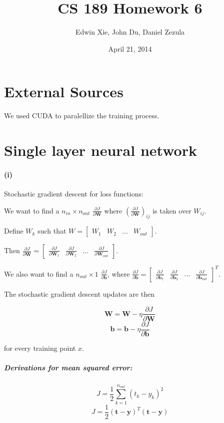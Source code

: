 \documentclass{article}
\title{CS 189 Homework 6}
\author{Edwin Xie, John Du, Daniel Zezula}
\date{April 21, 2014}
\begin{document}
\maketitle

\section*{External Sources}
We used CUDA to paralellize the training process.
\section*{Single layer neural network}

\paragraph{(i)} Stochastic gradient descent for loss functions:

We want to find a $n_{in} \times n_{out}$ $\frac{\partial{J}}{\partial{\mathbf{W}}}$
where $(\frac{\partial{J}}{\partial{\mathbf{W}}})_{ij}$ is taken over $W_{ij}$.

Define $W_k$ such that $W = \begin{bmatrix} W_1 & W_2 & ... & W_{out} \end{bmatrix}$.

Then $\frac{\partial{J}}{\partial{\mathbf{W}}} =
\begin{bmatrix}\frac{\partial{J}}{\partial{\mathbf{W}_1}} &
\frac{\partial{J}}{\partial{\mathbf{W}_2}} & ... &
\frac{\partial{J}}{\partial{\mathbf{W}_{out}}} \end{bmatrix}$.

We also want to find a $n_{out} \times 1$ $\frac{\partial{J}}{\partial{\mathbf{b}}}$,
where $\frac{\partial{J}}{\partial{\mathbf{b}}} =
\begin{bmatrix} \frac{\partial{J}}{\partial{\mathbf{b}_1}} &
\frac{\partial{J}}{\partial{\mathbf{b}_2}} & ... &
\frac{\partial{J}}{\partial{\mathbf{b}_{out}}} \end{bmatrix}^T$.

The stochastic gradient descent updates are then

$$\mathbf{W} = \mathbf{W} - \eta \dfrac{\partial{J}}{\partial{\mathbf{W}}}$$
$$\mathbf{b} = \mathbf{b} - \eta \dfrac{\partial{J}}{\partial{\mathbf{b}}}$$

for every training point $x$.


\subparagraph{Derivations for mean squared error:}
$$J = \dfrac{1}{2}\sum_{k=1}^{n_{out}}(t_k - y_k)^{2}$$
$$J = \dfrac{1}{2}(\mathbf{t} - \mathbf{y})^{T}(\mathbf{t} - \mathbf{y})$$
\end{document}
